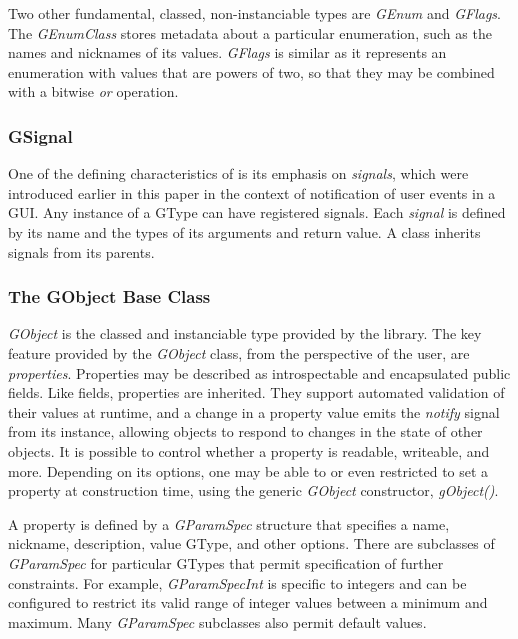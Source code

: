 \documentclass[article]{jss}
\begin{document}
Two other fundamental, classed, non-instanciable types are
\emph{GEnum} and 
\emph{GFlags}. The \emph{GEnumClass} stores metadata about a
particular
enumeration, such as the names and nicknames of its values.
\emph{GFlags} is
similar as it represents an enumeration with values that are powers of
two, 
so that they may be combined with a bitwise \emph{or} operation.

\subsubsection{GSignal}

One of the defining characteristics of  is its emphasis
on
\emph{signals}, which were introduced earlier in this paper in the
context of
notification of user events in a  GUI. Any instance of a
GType can 
have registered signals. Each \emph{signal} is defined by its name and
the types
of its arguments and return value. A class inherits signals from its
parents.

\subsubsection{The GObject Base Class}

\emph{GObject} is the classed and instanciable type provided by the
 library.  The key feature provided by the \emph{GObject} class, from the perspective of the 
 user, are \emph{properties}. Properties may be described
as introspectable and encapsulated public fields. Like fields, properties are inherited. They support automated validation 
of their values at runtime, and a change in a property value emits the 
\emph{notify} signal from its instance, allowing objects to respond
to changes in the state of other objects. It is possible to control
whether a 
property is readable, writeable, and more. Depending on its options,
one may be able to or even restricted to set a property at
construction time, 
using the generic \emph{GObject} constructor, \emph{gObject()}. 

A property is defined by a \emph{GParamSpec} structure that specifies
a name, 
nickname, description, value GType, and other options. There are
subclasses of 
\emph{GParamSpec} for particular GTypes that permit specification of
further 
constraints. For example, \emph{GParamSpecInt} is specific to integers
and can be
configured to restrict its valid range of integer values between a
minimum and maximum.
Many \emph{GParamSpec} subclasses also permit default values.
\end{document}
